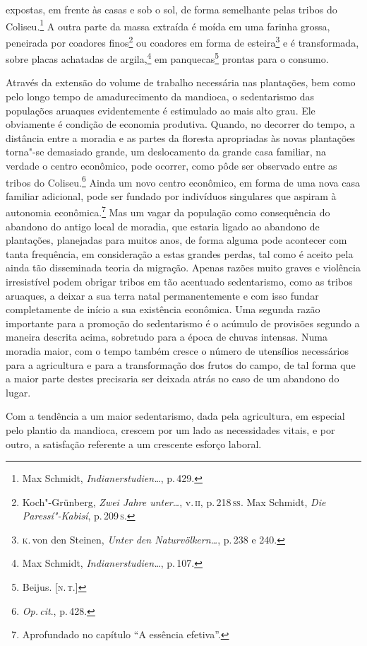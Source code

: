 expostas, em frente às casas e sob o sol, de forma semelhante pelas tribos
do Coliseu.\footnote{Max Schmidt,
  \textit{Indianerstudien\ldots}, p.\,429.} A outra parte da
massa extraída é moída em uma farinha grossa, peneirada por coadores
finos\footnote{Koch"-Grünberg, \textit{Zwei Jahre unter\ldots}, v.\,\textsc{ii}, p.\,218\,\textsc{ss}. Max Schmidt, \textit{Die Paressí"-Kabisí}, p.\,209\,\textsc{s}.} ou
coadores em forma de esteira\footnote{\textsc{k}.\,von den Steinen, \textit{Unter den Naturvölkern\ldots}, p.\,238 e 240.} e é transformada,
sobre placas achatadas de argila,\footnote{Max Schmidt,
  \textit{Indianerstudien\ldots}, p.\,107.} em panquecas\footnote{Beijus. {[}\textsc{n.\,t.}{]}}
 prontas para o consumo.

Através da extensão do volume de trabalho necessária nas plantações, bem
como pelo longo tempo de amadurecimento da mandioca, o sedentarismo das
populações aruaques evidentemente é estimulado ao mais alto grau. Ele
obviamente é condição de economia produtiva. Quando, no decorrer do
tempo, a distância entre a moradia e as partes da floresta apropriadas às
novas plantações torna"-se demasiado grande, um deslocamento da
grande casa familiar, na verdade o centro econômico, pode ocorrer, como
pôde ser observado entre as tribos do Coliseu.\footnote{\textit{Op.\,cit}., p.\,428.}
Ainda um novo centro econômico, em forma de uma nova casa familiar
adicional, pode ser fundado por indivíduos singulares que aspiram à
autonomia econômica.\footnote{Aprofundado no capítulo ``A essência efetiva''.} Mas um vagar da população
como consequência do abandono do antigo local de moradia, que estaria
ligado ao abandono de plantações, planejadas para muitos anos, de forma
alguma pode acontecer com tanta frequência, em consideração a estas
grandes perdas, tal como é aceito pela ainda tão disseminada teoria da
migração. Apenas razões muito graves e violência irresistível podem
obrigar tribos em tão acentuado sedentarismo, como as tribos aruaques, a
deixar a sua terra natal permanentemente e com isso fundar
completamente de início a sua existência econômica. Uma segunda razão
importante para a promoção do sedentarismo é o acúmulo de provisões
segundo a maneira descrita acima, sobretudo para a época de chuvas
intensas. Numa moradia maior, com o tempo também cresce o
número de utensílios necessários para a agricultura e para a
transformação dos frutos do campo, de tal forma que a maior parte destes
precisaria ser deixada atrás no caso de um abandono do lugar.

Com a tendência a um maior sedentarismo, dada pela agricultura, em
especial pelo plantio da mandioca, crescem por um lado as necessidades
vitais, e por outro, a satisfação referente a um
crescente esforço laboral.

